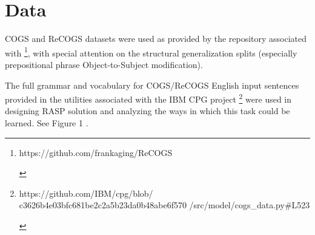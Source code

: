 \documentclass[11pt]{article}
\begin{document}
%
%
%

\section{Data}

COGS \cite{KimLinzen2020} and ReCOGS \cite{Wu2023} datasets were used as provided by the repository associated with \cite{Wu2023}\footnote{
\begin{tiny}
https://github.com/frankaging/ReCOGS
\end{tiny}},
with special attention on the structural generalization splits (especially prepositional phrase Object-to-Subject modification).

The full grammar and vocabulary for COGS/ReCOGS English input sentences provided in the utilities associated with the IBM CPG project \cite{klinger2024compositionalprogramgenerationfewshot}\footnote{
\begin{tiny}
https://github.com/IBM/cpg/blob/
c3626b4e03bfc681be2c2a5b23da0b48abe6f570
/src/model/cogs\_data.py\#L523
\end{tiny}}
were used in designing RASP solution and analyzing the ways in which this task could be learned.
See Figure 1 .
\end{document}
